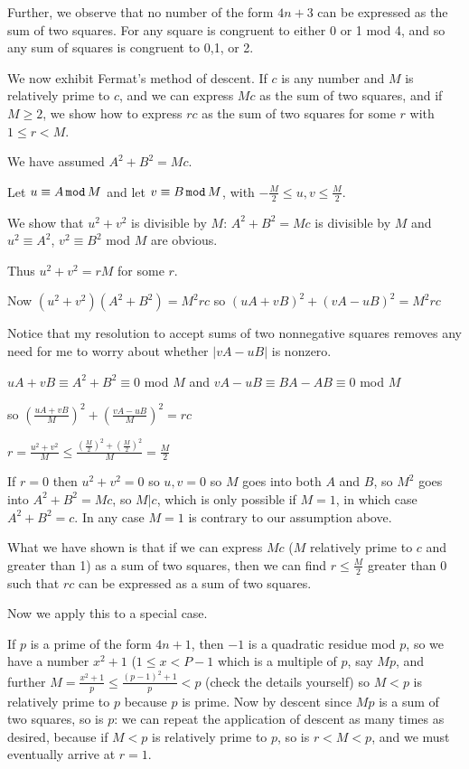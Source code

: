\documentclass[12pt]{article}
\begin{document}
Further, we observe that no number of the form $4n+3$ can be expressed as the sum of two squares.  For any square is congruent to either 0 or 1 mod 4, and so any sum of squares is congruent to 0,1, or 2.

We now exhibit Fermat's method of descent.   If $c$ is any number and $M$ is relatively prime to $c$, and we can express $Mc$ as the sum of two squares, and if $M \geq 2$, we show how to express $rc$ as the sum of two squares
for some $r$ with $1\leq r<M$.

We have assumed $A^2+B^2 = Mc$.

Let $u\equiv A \,{\tt mod}\,M$
and let $v \equiv B\,{\tt mod} \,M$,
with $-\frac M2 \leq u,v \leq \frac M2$.

We show that $u^2+v^2$ is divisible by $M$:  $A^2+B^2 = Mc$ is divisible by $M$ and $u^2\equiv A^2$, $v^2 \equiv B^2$ mod $M$ are obvious.

Thus $u^2+v^2=rM$ for some $r$.

Now $(u^2+v^2)(A^2+B^2)=M^2rc$  so $(uA+vB)^2+(vA-uB)^2=M^2rc$

Notice that my resolution to accept sums of two nonnegative squares removes any need for me to worry about whether $|vA-uB|$ is nonzero.

$uA+vB\equiv A^2+B^2 \equiv 0$ mod $M$ and $vA-uB\equiv BA-AB \equiv 0$ mod $M$

so $(\frac{uA+vB}M)^2+(\frac{vA-uB}M)^2=rc$

$r = \frac{u^2+v^2}M \leq \frac{(\frac M2)^2+(\frac M2)^2}M = \frac M2$

If $r=0$ then $u^2+v^2=0$ so $u,v=0$ so $M$ goes into both $A$ and $B$,
so $M^2$ goes into $A^2+B^2=Mc$, so $M|c$, which is only possible if $M=1$, in which case $A^2+B^2=c$.  In any case $M=1$ is contrary to our assumption above.

What we have shown is that if we can express $Mc$ ($M$ relatively prime to $c$ and greater than 1) as a sum of two squares, then we
can find $r \leq \frac M2$ greater than 0 such that $rc$ can be expressed as a sum of two squares.

Now we apply this to a special case.

If $p$ is a prime of the form $4n+1$, then $-1$ is a quadratic residue mod $p$, so we have a number $x^2+1$ ($1 \leq x < P-1$ which is a multiple of $p$, say $Mp$, and further
$M=\frac{x^2+1}p \leq \frac{(p-1)^2+1}p<p$  (check the details yourself) so $M<p$ is relatively prime to $p$ because $p$ is prime.  Now by descent since $Mp$ is a sum of two squares, 
so is $p$:  we can repeat the application of descent as many times as desired, because if $M<p$ is relatively prime to $p$, so is $r<M<p$, and we must eventually arrive at $r=1$.
\end{document}
